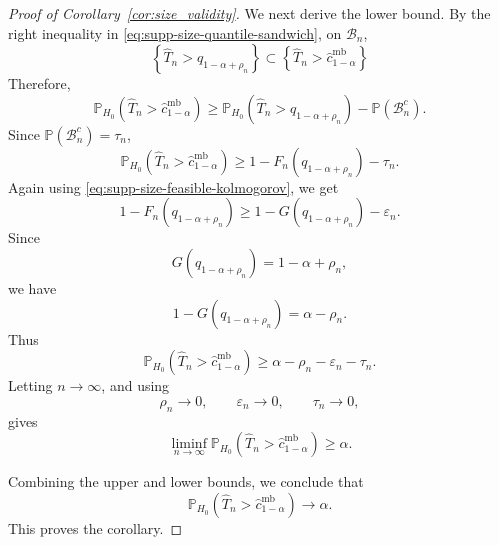 \documentclass[
  12pt]{article}
\theoremstyle{plain}
\theoremstyle{definition}
\theoremstyle{remark}
\begin{document}
\begin{proof}[Proof of Corollary~\ref{cor:size_validity}]
We next derive the lower bound.  By the right inequality in
\eqref{eq:supp-size-quantile-sandwich}, on \(\mathcal B_n\),
\[
\left\{
\widehat T_n>q_{1-\alpha+\rho_n}
\right\}
\subset
\left\{
\widehat T_n>\widehat c_{1-\alpha}^{\mathrm{mb}}
\right\}
\]
Therefore,
\[
\mathbb P_{H_0}
\left(
\widehat T_n>\widehat c_{1-\alpha}^{\mathrm{mb}}
\right)
\ge
\mathbb P_{H_0}
\left(
\widehat T_n>q_{1-\alpha+\rho_n}
\right)
-
\mathbb P(\mathcal B_n^c).
\]
Since \(\mathbb P(\mathcal B_n^c)=\tau_n\),
\[
\mathbb P_{H_0}
\left(
\widehat T_n>\widehat c_{1-\alpha}^{\mathrm{mb}}
\right)
\ge
1-F_n(q_{1-\alpha+\rho_n})
-
\tau_n.
\]
Again using \eqref{eq:supp-size-feasible-kolmogorov}, we get
\[
1-F_n(q_{1-\alpha+\rho_n})
\ge
1-G(q_{1-\alpha+\rho_n})
-
\varepsilon_n.
\]
Since
\[
G(q_{1-\alpha+\rho_n})
=
1-\alpha+\rho_n,
\]
we have
\[
1-G(q_{1-\alpha+\rho_n})
=
\alpha-\rho_n.
\]
Thus
\begin{equation}
\label{eq:supp-size-lower-bound}
\mathbb P_{H_0}
\left(
\widehat T_n>\widehat c_{1-\alpha}^{\mathrm{mb}}
\right)
\ge
\alpha-\rho_n-\varepsilon_n-\tau_n.
\end{equation}
Letting \(n\to\infty\), and using
\[
\rho_n\to0,
\qquad
\varepsilon_n\to0,
\qquad
\tau_n\to0,
\]
gives
\[
\liminf_{n\to\infty}
\mathbb P_{H_0}
\left(
\widehat T_n>\widehat c_{1-\alpha}^{\mathrm{mb}}
\right)
\ge
\alpha.
\]

Combining the upper and lower bounds, we conclude that
\[
\mathbb P_{H_0}
\left(
\widehat T_n>\widehat c_{1-\alpha}^{\mathrm{mb}}
\right)
\to
\alpha.
\]
This proves the corollary.
\end{proof}
\end{document}
